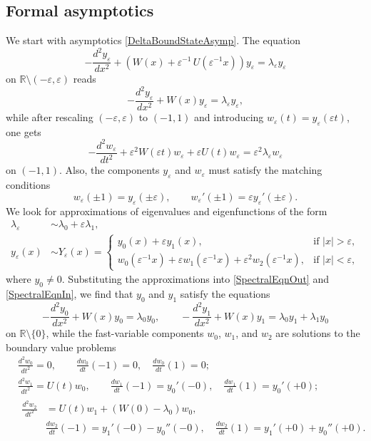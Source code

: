 \documentclass[reqno]{amsart}
\theoremstyle{definition}
\theoremstyle{remark}
\numberwithin{equation}{section}
\newcommand{\Real}{\mathbb R}
\newcommand{\eps}{\varepsilon}
\begin{document}
\subsection{Formal asymptotics}
We start with asymptotics \eqref{DeltaBoundStateAsymp}. The equation
\begin{equation*}
	-\frac{d^2y_\eps}{dx^2}+\left(W(x)+\eps^{-1}\,U(\eps^{-1}x)\right)y_\eps=\lambda_\eps y_\eps
\end{equation*}
on $\Real\setminus (-\eps,\eps)$ reads
\begin{equation}\label{SpectralEqnOut}
	-\frac{d^2y_\eps}{dx^2}+W(x)y_\eps=\lambda_\eps y_\eps,
\end{equation}
while after rescaling $(-\eps,\eps)$ to $(-1,1)$ and introducing  $w_\eps(t)=y_\eps(\eps t)$, one gets
\begin{equation}\label{SpectralEqnIn}
	-\frac{d^2w_\eps}{dt^2} + \eps^2 W(\eps t)w_\eps + \eps U(t) w_\eps=\eps^2\lambda_\eps w_\eps
\end{equation}
on $(-1,1)$. Also, the components $y_\eps$ and $w_\eps$ must satisfy the matching conditions
\begin{equation*}
	w_\eps(\pm 1)=y_\eps(\pm\eps), \qquad w_\eps'(\pm 1)=\eps y_\eps'(\pm\eps).
\end{equation*}
We look for approximations of eigenvalues and eigenfunctions of the form
\begin{align}\label{OmegaExp}
	\lambda_\eps&\sim \lambda_0+\eps \lambda_1,\\\label{YepsExp}
	y_\eps(x)&\sim Y_\eps(x)=
	\begin{cases}
		y_0(x)+\eps y_1(x),& \text{if } |x|>\eps,\\
		w_0(\eps^{-1}x)+\eps w_1(\eps^{-1}x)+\eps^2w_2(\eps^{-1}x),& \text{if } |x|<\eps,
	\end{cases}
\end{align}
where $y_0\neq 0$. Substituting the approximations into \eqref{SpectralEqnOut} and \eqref{SpectralEqnIn}, we find that $y_0$ and $y_1$ satisfy the equations
\begin{equation*}
	-\frac{d^2y_0}{dx^2}+W(x)y_0=\lambda_0 y_0,\qquad
	-\frac{d^2y_1}{dx^2}+W(x)y_1=\lambda_0 y_1+\lambda_1 y_0
\end{equation*}
on $\Real\setminus\{0\}$, while the fast-variable components $w_0$, $w_1$, and $w_2$ are solutions to the boundary value problems
\begin{align}
\label{W0problem}
  &\frac{d^2 w_0}{dt^2}=0,\qquad \frac{d w_0}{dt}(-1)=0, \quad \frac{d w_0}{dt}(1)=0;
\\\label{W1problem}
  &\frac{d^2 w_1}{dt^2}=U(t)w_0, \qquad \frac{d w_1}{dt}(-1)=y_0'(-0), \quad\frac{d w_1}{dt}(1)=y_0'(+0);
\\\label{W2problem}
  &
\begin{aligned}
\frac{d^2 w_2}{dt^2}&=U(t)w_1+(W(0)-\lambda_0)w_0,\\ &\frac{d w_2}{dt}(-1)=y_1'(-0)-y_0''(-0), \quad\frac{d w_2}{dt}(1)=y_1'(+0)+y_0''(+0).
\end{aligned}
\end{align}
\end{document}
